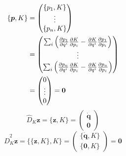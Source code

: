 \documentclass{article}
\renewcommand{\vec}[1]{\boldsymbol{#1}}
\begin{document}
\begin{align*}
	\{ \vec{p}, K \} &= 
	\begin{pmatrix}
		\{ p_1, K \} \\
		\vdots \\
		\{ p_n, K \}
	\end{pmatrix} \\
	&=
	\begin{pmatrix}
		\sum_i \left( \pdv{p_1}{q^i} \pdv{K}{p_i} - \pdv{K}{q^i} \pdv{p_1}{p_i} \right) \\
		\vdots \\
		\sum_i \left( \pdv{p_n}{q^i} \pdv{K}{p_i} - \pdv{K}{q^i} \pdv{p_n}{p_i} \right)
	\end{pmatrix} \\
	&=
	\begin{pmatrix}
		0 \\
		\vdots \\
		0
	\end{pmatrix} = \vec{0}
\end{align*}
\begin{equation}
	\hat{D}_K \vec{z} = \{ \vec{z}, K \} =
\begin{pmatrix}
	\dot{\vec{q}} \\
	\vec{0}
\end{pmatrix}
\end{equation}
\begin{equation}
	\hat{D}_K^2 \vec{z} = \{ \{ \vec{z}, K \}, K \} =
	\begin{pmatrix}
		\{ \dot{\vec{q}}, K \} \\
		\{ \vec{0}, K \}
	\end{pmatrix} = \vec{0}
\end{equation}
\end{document}
